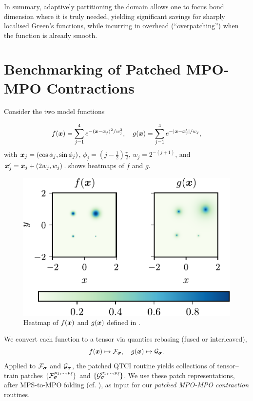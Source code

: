 In summary, adaptively partitioning the domain allows one to focus bond dimension where it is truly needed, yielding significant savings for sharply localised Green’s functions, while incurring in overhead (``overpatching'') when the function is already smooth.

\section{Benchmarking of Patched MPO-MPO Contractions}
\label{sec:benchmarkMPOMPOContr}
Consider the two model functions 

\begin{align}
f(\boldsymbol{x}) = \sum_{j=1}^4 e^{-(\boldsymbol{x} - \boldsymbol{x}_j)^2/w^2_j}, \quad  
g(\boldsymbol{x}) = \sum_{j=1}^4 e^{-|\boldsymbol{x} - \boldsymbol{x}'_j|/w_j}, 
\label{eq:linearGauss}
\end{align}
with $\boldsymbol{x}_j = (\cos \phi_j, \sin \phi_j )$, $\phi_j = (j-\frac{1}{2}) \frac{\pi}{2}$, $w_j =  2^{-(j+1)}$, and $\boldsymbol{x}'_j =\boldsymbol{x}_j + (2w_j,
w_j)$.  shows heatmaps of \(f\) and \(g\).

\begin{figure}[htbp]
    \centering
    \includegraphics{figures/linearCombGauss.pdf}
    \caption{Heatmap of $f(\boldsymbol{x})$ and $g(\boldsymbol{x})$ defined in .}
    \label{fig:factorsHeatmaps}
\end{figure}

We convert each function to a tensor via quantics rebasing (fused or interleaved),
\begin{equation}
    f(\boldsymbol{x}) \mapsto \mathcal{F}_{\boldsymbol{\sigma}}, \quad g(\boldsymbol{x}) \mapsto \mathcal{G}_{\boldsymbol{\sigma}}.
    \label{eq:tensorFactors}
\end{equation}
Applied to \(\mathcal{F}_{\boldsymbol{\sigma}}\) and \(\mathcal{G}_{\boldsymbol{\sigma}}\), the patched QTCI routine yields collections of tensor–train patches \(\{\mathcal{F}^{p_{1},\dots,p_{\bar\ell}}_{\boldsymbol{\sigma}}\}\) and \(\{\mathcal{G}^{p_{1},\dots,p_{\bar\ell}}_{\boldsymbol{\sigma}}\}\). We use these patch representations, after MPS-to-MPO folding (cf. ), as input for our \textit{patched MPO-MPO contraction} routines.

